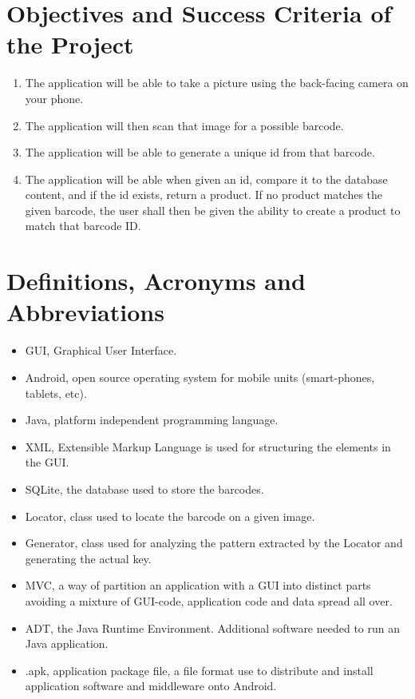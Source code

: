 \documentclass{report}
\begin{document}
\section{Objectives and Success Criteria of the Project}

\begin{enumerate}
  \item The application will be able to take a picture using the back-facing camera on your phone.
  \item The application will then scan that image for a possible barcode.
  \item The application will be able to generate a unique id from that barcode.
  \item The application will be able when given an id, compare it to the database content, and if the id exists, return a product. If no product matches the given barcode, the user shall then be given the ability to create a product to match that barcode ID.
\end{enumerate}

\section{Definitions, Acronyms and Abbreviations}

\begin{itemize}
    \item{GUI}, Graphical User Interface.
    \item{Android}, open source operating system for mobile units (smart-phones, tablets, etc).
    \item{Java}, platform independent programming language.
    \item{XML}, Extensible Markup Language is used for structuring the elements in the GUI.
    \item{SQLite}, the database used to store the barcodes.
    \item{Locator}, class used to locate the barcode on a given image.
    \item{Generator}, class used for analyzing the pattern extracted by the Locator and generating the actual key.
    \item{MVC}, a way of partition an application with a GUI into distinct parts avoiding a mixture of GUI-code, application code and data spread all over.
    \item{ADT}, the Java Runtime Environment. Additional software needed to run an Java application.
    \item{.apk}, application package file, a file format use to distribute and install application software and middleware onto Android.
\end{itemize}
\end{document}
